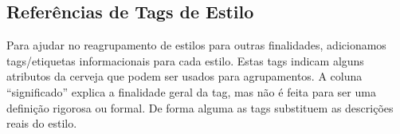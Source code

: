 \clearpage
\subsection*{Referências de Tags de Estilo}

Para ajudar no reagrupamento de estilos para outras finalidades, adicionamos tags/etiquetas informacionais para cada estilo. Estas tags indicam alguns atributos da cerveja que podem ser usados para agrupamentos. A coluna “significado” explica a finalidade geral da tag, mas não é feita para ser uma definição rigorosa ou formal. De forma alguma as tags substituem as descrições reais do estilo.

\renewcommand{\arraystretch}{1.2}


